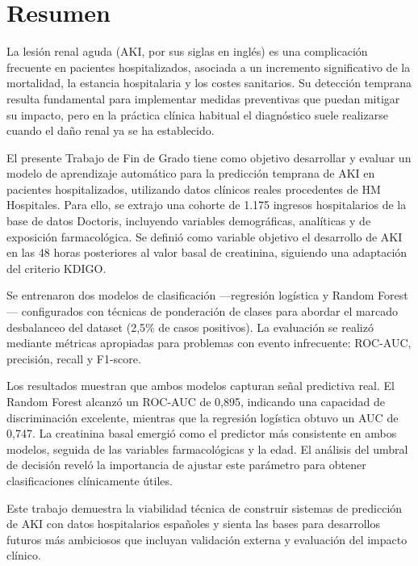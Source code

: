 \documentclass[12pt, a4paper, oneside]{report}
\begin{document}
\newpage
\thispagestyle{empty}
\mbox{}
\newpage

\chapter*{Resumen}
La lesión renal aguda (AKI, por sus siglas en inglés) es una complicación frecuente en pacientes hospitalizados, asociada a un incremento significativo de la mortalidad, la estancia hospitalaria y los costes sanitarios. Su detección temprana resulta fundamental para implementar medidas preventivas que puedan mitigar su impacto, pero en la práctica clínica habitual el diagnóstico suele realizarse cuando el daño renal ya se ha establecido.

El presente Trabajo de Fin de Grado tiene como objetivo desarrollar y evaluar un modelo de aprendizaje automático para la predicción temprana de AKI en pacientes hospitalizados, utilizando datos clínicos reales procedentes de HM Hospitales. Para ello, se extrajo una cohorte de 1.175 ingresos hospitalarios de la base de datos Doctoris, incluyendo variables demográficas, analíticas y de exposición farmacológica. Se definió como variable objetivo el desarrollo de AKI en las 48 horas posteriores al valor basal de creatinina, siguiendo una adaptación del criterio KDIGO.

Se entrenaron dos modelos de clasificación —regresión logística y Random Forest— configurados con técnicas de ponderación de clases para abordar el marcado desbalanceo del dataset (2,5\% de casos positivos). La evaluación se realizó mediante métricas apropiadas para problemas con evento infrecuente: ROC-AUC, precisión, recall y F1-score.

Los resultados muestran que ambos modelos capturan señal predictiva real. El Random Forest alcanzó un ROC-AUC de 0,895, indicando una capacidad de discriminación excelente, mientras que la regresión logística obtuvo un AUC de 0,747. La creatinina basal emergió como el predictor más consistente en ambos modelos, seguida de las variables farmacológicas y la edad. El análisis del umbral de decisión reveló la importancia de ajustar este parámetro para obtener clasificaciones clínicamente útiles.

Este trabajo demuestra la viabilidad técnica de construir sistemas de predicción de AKI con datos hospitalarios españoles y sienta las bases para desarrollos futuros más ambiciosos que incluyan validación externa y evaluación del impacto clínico.
\end{document}
